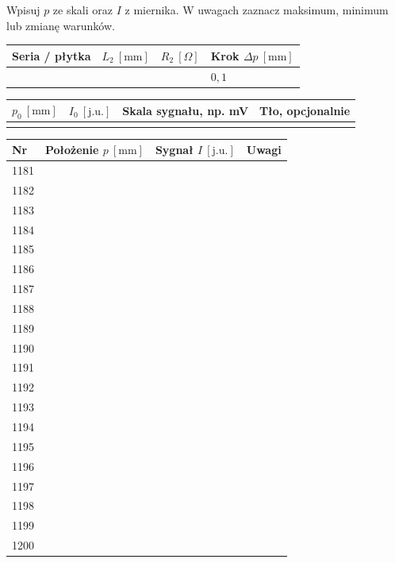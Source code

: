 \documentclass[11pt,a4paper]{article}
\newcommand{\note}[1]{{\small #1}\par}
\begin{document}
\note{Wpisuj $p$ ze skali oraz $I$ z miernika. W uwagach zaznacz maksimum, minimum lub zmianę warunków.}
\begin{tabularx}{\linewidth}{|Y|Y|Y|Y|}\hline
\textbf{Seria / płytka} & \textbf{$L_2\ [\mathrm{mm}]$} & \textbf{$R_2\ [\Omega]$} & \textbf{Krok $\Delta p\ [\mathrm{mm}]$}\\\hline
\rule{0pt}{7mm} &  &  & $0{,}1$ \\\hline
\end{tabularx}\par\smallskip
\begin{tabularx}{\linewidth}{|Y|Y|Y|Y|}\hline
\textbf{$p_0\ [\mathrm{mm}]$} & \textbf{$I_0\ [\mathrm{j.u.}]$} & \textbf{Skala sygnału, np. mV} & \textbf{Tło, opcjonalnie}\\\hline
\rule{0pt}{7mm} &  &  &  \\\hline
\end{tabularx}\par\smallskip
\begin{tabularx}{\linewidth}{|p{9mm}|Y|Y|Y|}\hline
\textbf{Nr} & \textbf{Położenie $p\ [\mathrm{mm}]$} & \textbf{Sygnał $I\ [\mathrm{j.u.}]$} & \textbf{Uwagi}\\\hline
\rule{0pt}{7mm}1181 &  &  & \\\hline
\rule{0pt}{7mm}1182 &  &  & \\\hline
\rule{0pt}{7mm}1183 &  &  & \\\hline
\rule{0pt}{7mm}1184 &  &  & \\\hline
\rule{0pt}{7mm}1185 &  &  & \\\hline
\rule{0pt}{7mm}1186 &  &  & \\\hline
\rule{0pt}{7mm}1187 &  &  & \\\hline
\rule{0pt}{7mm}1188 &  &  & \\\hline
\rule{0pt}{7mm}1189 &  &  & \\\hline
\rule{0pt}{7mm}1190 &  &  & \\\hline
\rule{0pt}{7mm}1191 &  &  & \\\hline
\rule{0pt}{7mm}1192 &  &  & \\\hline
\rule{0pt}{7mm}1193 &  &  & \\\hline
\rule{0pt}{7mm}1194 &  &  & \\\hline
\rule{0pt}{7mm}1195 &  &  & \\\hline
\rule{0pt}{7mm}1196 &  &  & \\\hline
\rule{0pt}{7mm}1197 &  &  & \\\hline
\rule{0pt}{7mm}1198 &  &  & \\\hline
\rule{0pt}{7mm}1199 &  &  & \\\hline
\rule{0pt}{7mm}1200 &  &  & \\\hline
\end{tabularx}\par\smallskip
\end{document}
